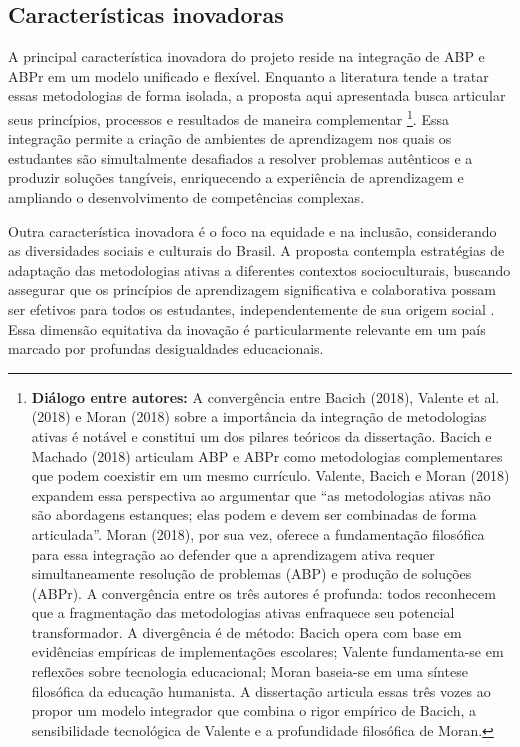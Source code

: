 \subsection{Características inovadoras}
\label{subsec:carac_inov}

A principal característica inovadora do projeto reside na integração de ABP e ABPr em um modelo unificado e flexível. Enquanto a literatura tende a tratar essas metodologias de forma isolada, a proposta aqui apresentada busca articular seus princípios, processos e resultados de maneira complementar \cite{BACICH2018}\footnote{\textbf{Diálogo entre autores:} A convergência entre Bacich (2018), Valente et al. (2018) e Moran (2018) sobre a importância da integração de metodologias ativas é notável e constitui um dos pilares teóricos da dissertação. Bacich e Machado (2018) articulam ABP e ABPr como metodologias complementares que podem coexistir em um mesmo currículo. Valente, Bacich e Moran (2018) expandem essa perspectiva ao argumentar que ``as metodologias ativas não são abordagens estanques; elas podem e devem ser combinadas de forma articulada''. Moran (2018), por sua vez, oferece a fundamentação filosófica para essa integração ao defender que a aprendizagem ativa requer simultaneamente resolução de problemas (ABP) e produção de soluções (ABPr). A convergência entre os três autores é profunda: todos reconhecem que a fragmentação das metodologias ativas enfraquece seu potencial transformador. A divergência é de método: Bacich opera com base em evidências empíricas de implementações escolares; Valente fundamenta-se em reflexões sobre tecnologia educacional; Moran baseia-se em uma síntese filosófica da educação humanista. A dissertação articula essas três vozes ao propor um modelo integrador que combina o rigor empírico de Bacich, a sensibilidade tecnológica de Valente e a profundidade filosófica de Moran.}. Essa integração permite a criação de ambientes de aprendizagem nos quais os estudantes são simultalmente desafiados a resolver problemas autênticos e a produzir soluções tangíveis, enriquecendo a experiência de aprendizagem e ampliando o desenvolvimento de competências complexas.

Outra característica inovadora é o foco na equidade e na inclusão, considerando as diversidades sociais e culturais do Brasil. A proposta contempla estratégias de adaptação das metodologias ativas a diferentes contextos socioculturais, buscando assegurar que os princípios de aprendizagem significativa e colaborativa possam ser efetivos para todos os estudantes, independentemente de sua origem social \cite{CALLEGARIO2025}. Essa dimensão equitativa da inovação é particularmente relevante em um país marcado por profundas desigualdades educacionais.

